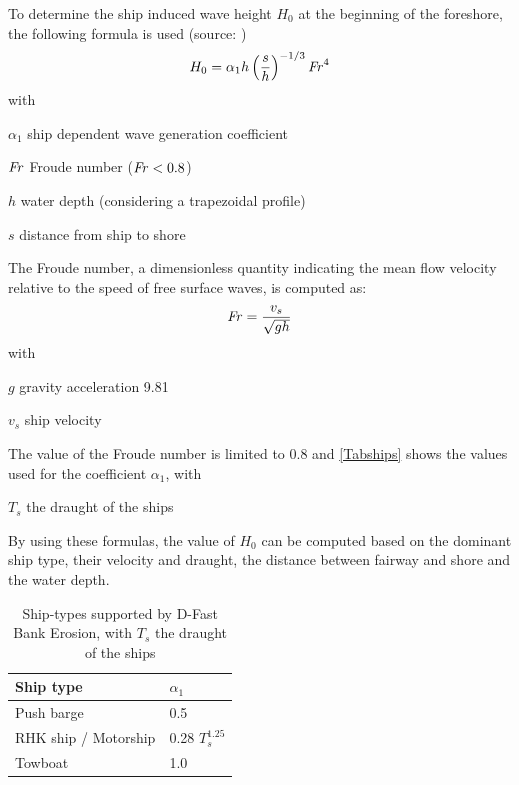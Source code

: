 To determine the ship induced wave height $H_0$  at the beginning of the foreshore, the following formula is used (source: \cite{rockmanual})
%
\begin{equation}
H_0 = \alpha_1 h \left ( \frac{s}{h} \right )^{-1/3} \operatorname{\mathit{F\kern-.17em r}}^4
\end{equation}
%
with
%
\begin{symbollist}
\item[$\alpha_1$] ship dependent wave generation coefficient \unitbrackets{-}
\item[$\operatorname{\mathit{F\kern-.17em r}}$] Froude number ($\operatorname{\mathit{F\kern-.17em r}} < \text{0.8}$) \unitbrackets{-}
\item[$h$] water depth (considering a  trapezoidal profile) 
\item[$s$] distance from ship to shore 
\end{symbollist}
%
The Froude number, a dimensionless quantity indicating the mean flow velocity relative to the speed of free surface waves, is computed as:
%
\begin{equation}
\operatorname{\mathit{F\kern-.17em r}} = \frac{v_s}{\sqrt{g h}}
\end{equation}
%
with
%
\begin{symbollist}
\item[$g$] gravity acceleration 9.81 
\item[$v_s$] ship velocity 
\end{symbollist}

The value of the Froude number is limited to 0.8 and \autoref{Tabships} shows the values used for the coefficient $\alpha_1$, with 
\begin{symbollist}
	\item[$T_s$]  the draught of the ships 
\end{symbollist}


By using these formulas, the value of $H_0$ can be computed based on the dominant ship type, their velocity and draught, the distance between fairway and shore and the water depth.

\begin{table}[!h]
	\begin{tabular}{ll}
		Ship type & $\alpha_1$ \\ \hline
		Push barge & 0.5 \\
		RHK ship / Motorship & 0.28 $T_s^\text{1.25}$ \\
		Towboat & 1.0 \\ \hline
	\end{tabular}
	\caption{Ship-types supported by D-Fast Bank Erosion, with $T_s$  the draught of the ships}
	\label{Tabships}
\end{table}

